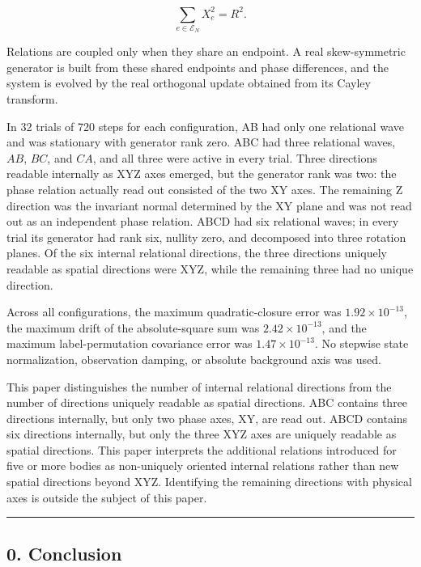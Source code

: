 \documentclass[
  10pt,
  a4paper,
]{article}
\begin{document}
\[
\sum_{e\in\mathcal E_N}X_e^2=R^2.
\]

Relations are coupled only when they share an endpoint. A real
skew-symmetric generator is built from these shared endpoints and phase
differences, and the system is evolved by the real orthogonal update
obtained from its Cayley transform.

In 32 trials of 720 steps for each configuration, AB had only one
relational wave and was stationary with generator rank zero. ABC had
three relational waves, \(AB\), \(BC\), and \(CA\), and all three were
active in every trial. Three directions readable internally as XYZ axes
emerged, but the generator rank was two: the phase relation actually
read out consisted of the two XY axes. The remaining Z direction was the
invariant normal determined by the XY plane and was not read out as an
independent phase relation. ABCD had six relational waves; in every
trial its generator had rank six, nullity zero, and decomposed into
three rotation planes. Of the six internal relational directions, the
three directions uniquely readable as spatial directions were XYZ, while
the remaining three had no unique direction.

Across all configurations, the maximum quadratic-closure error was
\(1.92\times10^{-13}\), the maximum drift of the absolute-square sum was
\(2.42\times10^{-13}\), and the maximum label-permutation covariance
error was \(1.47\times10^{-13}\). No stepwise state normalization,
observation damping, or absolute background axis was used.

This paper distinguishes the number of internal relational directions
from the number of directions uniquely readable as spatial directions.
ABC contains three directions internally, but only two phase axes, XY,
are read out. ABCD contains six directions internally, but only the
three XYZ axes are uniquely readable as spatial directions. This paper
interprets the additional relations introduced for five or more bodies
as non-uniquely oriented internal relations rather than new spatial
directions beyond XYZ. Identifying the remaining directions with
physical axes is outside the subject of this paper.

\begin{center}\rule{0.5\linewidth}{0.5pt}\end{center}

\subsection{0. Conclusion}\label{conclusion}
\end{document}
